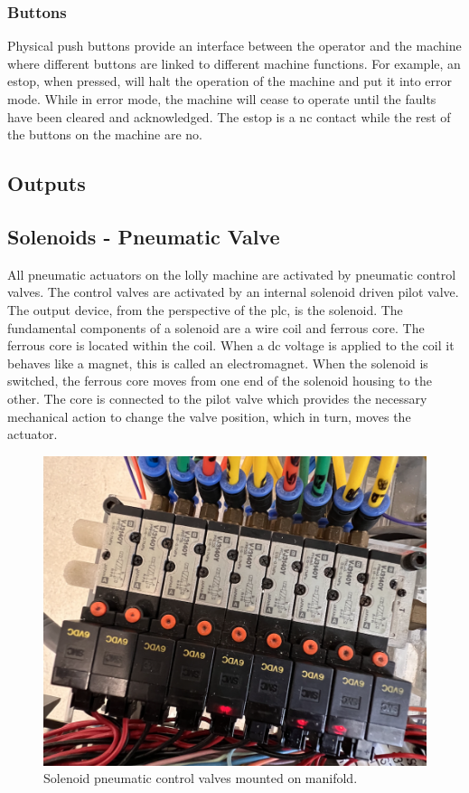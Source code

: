     \subsubsection{Buttons}
    Physical push buttons provide an interface between the operator and the machine where different buttons are linked to different machine functions. For example, an \acrfull{estop}, when pressed, will halt the operation of the machine and put it into error mode. While in error mode, the machine will cease to operate until the faults have been cleared and acknowledged. The \acrshort{estop} is a \acrshort{nc} contact while the rest of the buttons on the machine are \acrshort{no}.
    
\subsection{Outputs}
    \subsection{Solenoids - Pneumatic Valve}
    All pneumatic actuators on the lolly machine are activated by pneumatic control valves. The control valves are activated by an internal solenoid driven pilot valve.  The output device, from the perspective of the \acrshort{plc}, is the solenoid. The fundamental components of a solenoid are a wire coil and ferrous core. The ferrous core is located within the coil. When a \acrshort{dc} voltage is applied to the coil it behaves like a magnet, this is called an electromagnet. When the solenoid is switched, the ferrous core moves from one end of the solenoid housing to the other. The core is connected to the pilot valve which provides the necessary mechanical action to change the valve position, which in turn, moves the actuator. 
    
        \begin{figure}[H]
            \centering
            \includegraphics[scale = 0.5]{2_images/controlValvesPic.png}
            \caption{Solenoid pneumatic control valves mounted on manifold.}
            \label{fig:controlValvesPic}
        \end{figure} 
    
